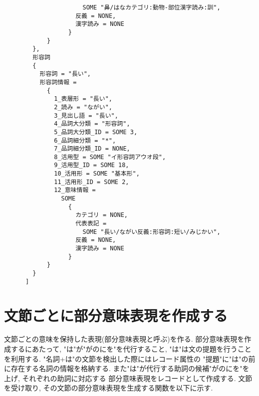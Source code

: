 \documentclass{jreport}
\begin{document}
\begin{verbatim}
                      SOME "鼻/はなカテゴリ:動物-部位漢字読み:訓",
                    反義 = NONE,
                    漢字読み = NONE
                  }
            }
        },
        形容詞
        {
          形容詞 = "長い",
          形容詞情報 =
            {
              1_表層形 = "長い",
              2_読み = "ながい",
              3_見出し語 = "長い",
              4_品詞大分類 = "形容詞",
              5_品詞大分類_ID = SOME 3,
              6_品詞細分類 = "*",
              7_品詞細分類_ID = NONE,
              8_活用型 = SOME "イ形容詞アウオ段",
              9_活用型_ID = SOME 18,
              10_活用形 = SOME "基本形",
              11_活用形_ID = SOME 2,
              12_意味情報 =
                SOME
                  {
                    カテゴリ = NONE,
                    代表表記 =
                      SOME "長い/ながい反義:形容詞:短い/みじかい",
                    反義 = NONE,
                    漢字読み = NONE
                  }
            }
        }
      ]
\end{verbatim}


\section{文節ごとに部分意味表現を作成する}
文節ごとの意味を保持した表現(部分意味表現と呼ぶ)を作る. 部分意味表現を作成するにあたって, 
"は"が"がのにを"を代行すること, "は"は文の提題を行うことを利用する. "名詞+は"の文節を検出した際にはレコード属性の
"提題"に"は"の前に存在する名詞の情報を格納する. また"は"が代行する助詞の候補"がのにを"を上げ, それぞれの助詞に対応する
部分意味表現をレコードとして作成する. 文節を受け取り, その文節の部分意味表現を生成する関数を以下に示す.
\end{document}
